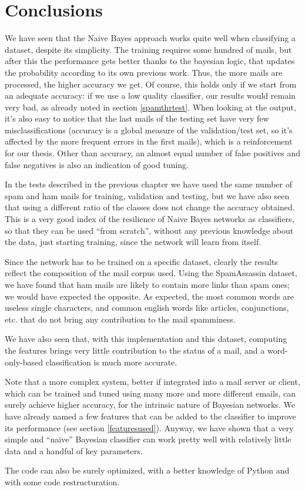 \section{Conclusions}
We have seen that the Naive Bayes approach works quite well when classifying a dataset, despite its simplicity. The training requires some hundred of mails, but after this the performance gets better thanks to the bayesian logic, that updates the probability according to its own previous work. Thus, the more mails are processed, the higher accuracy we get. Of course, this holds only if we start from an adequate accuracy: if we use a low quality classifier, our results would remain very bad, as already noted in section \ref{spamthrtest}. When looking at the output, it's also easy to notice that the last mails of the testing set have very few misclassifications (accuracy is a global measure of the validation/test set, so it's affected by the more frequent errors in the first mails), which is a reinforcement for our thesis. Other than accuracy, an almost equal number of false positives and false negatives is also an indication of good tuning.

In the tests described in the previous chapter we have used the same number of spam and ham mails for training, validation and testing, but we have also seen that using a different ratio of the classes does not change the accuracy obtained. This is a very good index of the resilience of Naive Bayes networks as classifiers, so that they can be used ``from scratch'', without any previous knowledge about the data, just starting training, since the network will learn from itself.

Since the network has to be trained on a specific dataset, clearly the results reflect the composition of the mail corpus used. Using the SpamAssassin dataset, we have found that ham mails are likely to contain more links than spam ones; we would have expected the opposite. As expected, the most common words are useless single characters, and common english words like articles, conjunctions, etc. that do not bring any contribution to the mail spamminess.

We have also seen that, with this implementation and this dataset, computing the features brings very little contribution to the status of a mail, and a word-only-based classification is much more accurate.

Note that a more complex system, better if integrated into a mail server or client, which can be trained and tuned using many more and more different emails, can surely achieve higher accuracy, for the intrinsic nature of Bayesian networks. We have already named a few features that can be added to the classifier to improve its performance (see section \ref{featuresused}). Anyway, we have shown that a very simple and ``naive'' Bayesian classifier can work pretty well with relatively little data and a handful of key parameters.

The code can also be surely optimized, with a better knowledge of Python and with some code restructuration.
